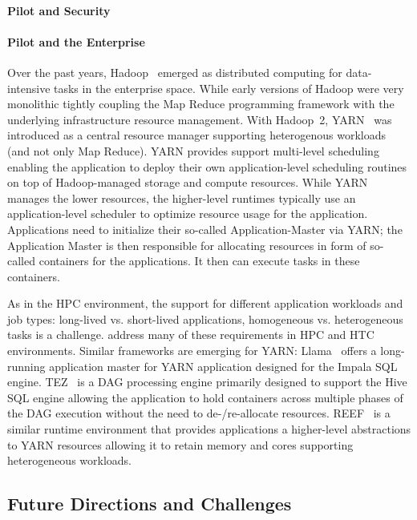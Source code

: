 \documentclass{sig-alternate}
\begin{document}
\paragraph*{Pilot and Security} 

\paragraph*{Pilot and the Enterprise} Over the past years,
Hadoop~\cite{hadoop} emerged as distributed computing for data-intensive
tasks in the enterprise space. While early versions of Hadoop were very
monolithic tightly coupling the Map Reduce programming framework with
the underlying infrastructure resource management. With Hadoop~2,
YARN~\cite{yarn-paper} was introduced as a central resource manager
supporting heterogenous workloads (and not only Map Reduce). YARN
provides support multi-level scheduling enabling the application to
deploy their own application-level scheduling routines on top of
Hadoop-managed storage and compute resources. While YARN manages the
lower resources, the higher-level runtimes typically use an
application-level scheduler to optimize resource usage for the
application. Applications need to initialize their so-called
Application-Master via YARN; the Application Master is then responsible
for allocating resources in form of so-called containers for the
applications. It then can execute tasks in these containers.

As in the HPC environment, the support for different application
workloads and job types: long-lived vs. short-lived applications,
homogeneous vs. heterogeneous tasks is a challenge. \pilots address many
of these requirements in HPC and HTC environments. Similar frameworks
are emerging for YARN: Llama~\cite{llama} offers a long-running
application master for YARN application designed for the Impala SQL
engine. TEZ~\cite{tez} is a DAG processing engine primarily designed to
support the Hive SQL engine allowing the application to hold containers
across multiple phases of the DAG execution without the need to
de-/re-allocate resources. REEF~\cite{Chun:2013:RRE:2536274.2536318} is
a similar runtime environment that provides applications a higher-level
abstractions to YARN resources allowing it to retain memory and cores
supporting heterogeneous workloads.

\subsection{Future Directions and Challenges}
\label{sec:5.3}
\end{document}
